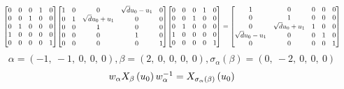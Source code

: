 \documentclass[11pt]{article}
\theoremstyle{definition}
\begin{document}
\[
\scaletoalign{\textwidth}{{\left[\begin{matrix}0 & 0 & 0 & 1 & 0\\0 & 0 & 1 & 0 & 0\\0 & 1 & 0 & 0 & 0\\1 & 0 & 0 & 0 & 0\\0 & 0 & 0 & 0 & 1\end{matrix}\right]} {\left[\begin{matrix}1 & 0 & 0 & \sqrt{d} u_{0} - u_{1} & 0\\0 & 1 & \sqrt{d} u_{0} + u_{1} & 0 & 0\\0 & 0 & 1 & 0 & 0\\0 & 0 & 0 & 1 & 0\\0 & 0 & 0 & 0 & 1\end{matrix}\right]} {\left[\begin{matrix}0 & 0 & 0 & 1 & 0\\0 & 0 & 1 & 0 & 0\\0 & 1 & 0 & 0 & 0\\1 & 0 & 0 & 0 & 0\\0 & 0 & 0 & 0 & 1\end{matrix}\right]} = {\left[\begin{matrix}1 & 0 & 0 & 0 & 0\\0 & 1 & 0 & 0 & 0\\0 & \sqrt{d} u_{0} + u_{1} & 1 & 0 & 0\\\sqrt{d} u_{0} - u_{1} & 0 & 0 & 1 & 0\\0 & 0 & 0 & 0 & 1\end{matrix}\right]}}
\]
\[
\alpha = \left( -1, \  -1, \  0, \  0, \  0\right), \beta = \left( 2, \  0, \  0, \  0, \  0\right), \sigma_{\alpha}(\beta) = \left( 0, \  -2, \  0, \  0, \  0\right)
\]
\[
\scaletoalign{\textwidth}{w_{\alpha} X_{\beta}\left(u_{0}\right) w_{\alpha}^{-1} = X_{\sigma_{\alpha}\left(\beta\right)}\left(u_{0}\right)}
\]
\end{document}
